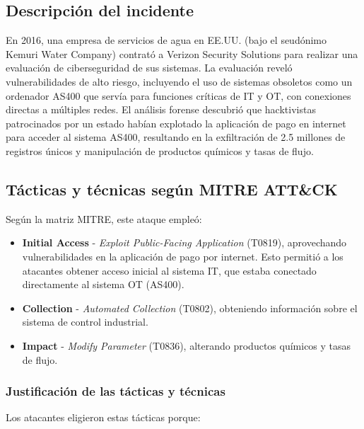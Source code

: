 \subsection{Descripción del incidente}
En 2016, una empresa de servicios de agua en EE.UU. (bajo el seudónimo Kemuri Water Company) contrató a Verizon Security Solutions para realizar una evaluación de ciberseguridad de sus sistemas. La evaluación reveló vulnerabilidades de alto riesgo, incluyendo el uso de sistemas obsoletos como un ordenador AS400 que servía para funciones críticas de IT y OT, con conexiones directas a múltiples redes. El análisis forense descubrió que hacktivistas patrocinados por un estado habían explotado la aplicación de pago en internet para acceder al sistema AS400, resultando en la exfiltración de 2.5 millones de registros únicos y manipulación de productos químicos y tasas de flujo.

\subsection{Tácticas y técnicas según MITRE ATT\&CK}
Según la matriz MITRE, este ataque empleó:

\begin{itemize}
    \item \textbf{Initial Access} - \textit{Exploit Public-Facing Application} (T0819), aprovechando vulnerabilidades en la aplicación de pago por internet.
    Esto permitió a los atacantes obtener acceso inicial al sistema IT, que estaba conectado directamente al sistema OT (AS400).
    
    
    \item \textbf{Collection} - \textit{Automated Collection} (T0802), obteniendo información sobre el sistema de control industrial.
    
    \item \textbf{Impact} - \textit{Modify Parameter} (T0836), alterando productos químicos y tasas de flujo.
\end{itemize}

\subsubsection{Justificación de las tácticas y técnicas}
Los atacantes eligieron estas tácticas porque:

